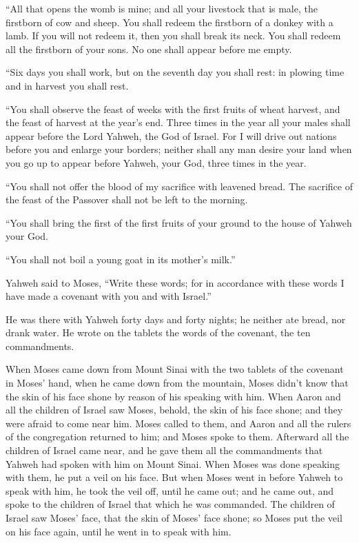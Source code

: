  ``All that opens the womb is mine; and all your livestock
that is male, the firstborn of cow and sheep.  You shall
redeem the firstborn of a donkey with a lamb. If you will not redeem it,
then you shall break its neck. You shall redeem all the firstborn of
your sons. No one shall appear before me empty.

 ``Six days you shall work, but on the seventh day you
shall rest: in plowing time and in harvest you shall rest.

 ``You shall observe the feast of weeks with the first
fruits of wheat harvest, and the feast of harvest at the year's end.
 Three times in the year all your males shall appear before
the Lord Yahweh, the God of Israel.  For I will drive out
nations before you and enlarge your borders; neither shall any man
desire your land when you go up to appear before Yahweh, your God, three
times in the year.

 ``You shall not offer the blood of my sacrifice with
leavened bread. The sacrifice of the feast of the Passover shall not be
left to the morning.

 ``You shall bring the first of the first fruits of your
ground to the house of Yahweh your God.

``You shall not boil a young goat in its mother's milk.''

 Yahweh said to Moses, ``Write these words; for in
accordance with these words I have made a covenant with you and with
Israel.''

 He was there with Yahweh forty days and forty nights; he
neither ate bread, nor drank water. He wrote on the tablets the words of
the covenant, the ten commandments.

 When Moses came down from Mount Sinai with the two tablets
of the covenant in Moses' hand, when he came down from the mountain,
Moses didn't know that the skin of his face shone by reason of his
speaking with him.  When Aaron and all the children of
Israel saw Moses, behold, the skin of his face shone; and they were
afraid to come near him.  Moses called to them, and Aaron
and all the rulers of the congregation returned to him; and Moses spoke
to them.  Afterward all the children of Israel came near,
and he gave them all the commandments that Yahweh had spoken with him on
Mount Sinai.  When Moses was done speaking with them, he
put a veil on his face.  But when Moses went in before
Yahweh to speak with him, he took the veil off, until he came out; and
he came out, and spoke to the children of Israel that which he was
commanded.  The children of Israel saw Moses' face, that
the skin of Moses' face shone; so Moses put the veil on his face again,
until he went in to speak with him.

